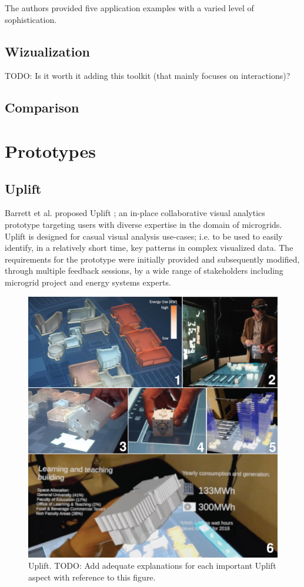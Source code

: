 \documentclass{vgtc}                          %
\begin{document}
\noindent The authors provided five application examples with a varied level of
sophistication.

\subsection{Wizualization}

TODO: Is it worth it adding this toolkit (that mainly focuses on interactions)?

\subsection{Comparison}

\section{Prototypes}
\subsection{Uplift}
Barrett et al. proposed Uplift \cite{uplift_prototype}; an in-place
collaborative visual analytics prototype targeting users with diverse
expertise in the domain of microgrids. Uplift is designed for casual visual
analysis use-cases; i.e. to be used to easily identify, in a relatively short
time, key patterns in complex visualized data. The requirements for the
prototype were initially provided and subsequently modified, through multiple
feedback sessions, by a wide range of stakeholders including microgrid project
and energy systems experts.

\smallskip

\begin{figure}[tb]
	\centering
	\includegraphics[width=\columnwidth]{uplift}
	\caption[Caption for Uplift]{Uplift. TODO: Add adequate explanations for
		each important Uplift aspect with reference to this figure.}
	\label{fig:uplift}
\end{figure}
\end{document}
